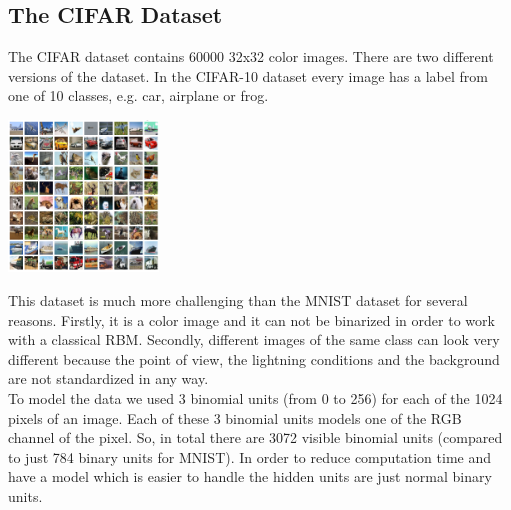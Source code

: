 \documentclass[a4paper]{scrartcl}
\begin{document}
\subsection{The CIFAR Dataset}
The CIFAR dataset contains 60000 32x32 color images. There are two different versions of the dataset. In the CIFAR-10 dataset every image has a label from one of 10 classes, e.g. car, airplane or frog. 
\begin{center}
\includegraphics[width=4cm]{images/cifar-10.png}
\end{center} 
This dataset is much more challenging than the MNIST dataset for several reasons. Firstly, it is a color image and it can not be binarized in order to work with a classical RBM. Secondly, different images of the same class can look very different because the point of view, the lightning conditions and the background are not standardized in any way. \\
To model the data we used 3 binomial units (from 0 to 256) for each of the 1024 pixels of an image. Each of these 3 binomial units models one of the RGB channel of the pixel. So, in total there are 3072 visible binomial units (compared to just 784 binary units for MNIST).
In order to reduce computation time and have a model which is easier to handle the hidden units are just normal binary units.
\newpage
\end{document}
